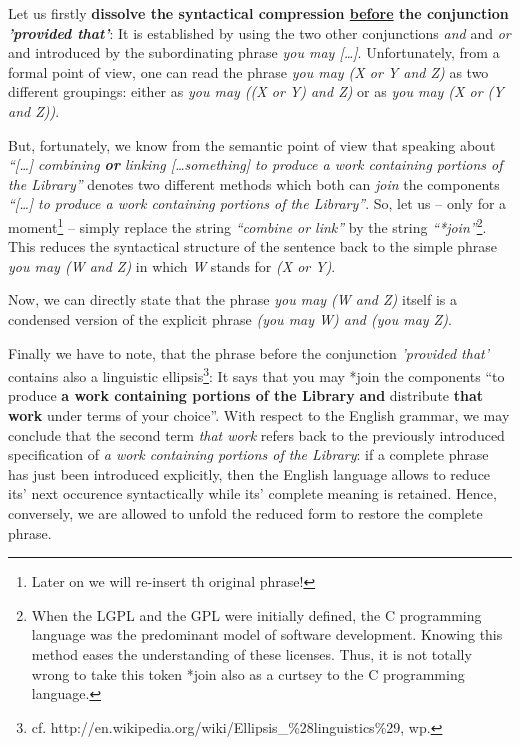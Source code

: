 Let us firstly \textbf{dissolve the syntactical compression \underline{before}
the conjunction \emph{'provided that'}}: It is established by using the two
other conjunctions \emph{and} and \emph{or} and introduced by the subordinating
phrase \emph{you may [\ldots]}. Unfortunately, from a formal point of view, one
can read the phrase \emph{you may (X or Y and Z)} as two different groupings:
either as \emph{you may ((X or Y) and Z)} or as \emph{you may (X or (Y and Z))}.

But, fortunately, we know from the semantic point of view that speaking about
\emph{\enquote{[\ldots] combining \textbf{or} linking [\ldots something] to
produce a work containing portions of the Library}} denotes two different
methods which both can \emph{join} the components \emph{\enquote{[\ldots] to
produce a work containing portions of the Library}}. So, let us -- only for a
moment\footnote{Later on we will re-insert th original phrase!} -- simply
replace the string \emph{\enquote{combine or link}} by the string
\emph{\enquote{*join}}\footnote{When the LGPL and the GPL were initially
defined, the C programming language was the predominant model of software
development. Knowing this method eases the understanding of these licenses.
Thus, it is not totally wrong to take this token *join also as a curtsey to the
C programming language.}. This reduces the syntactical structure of the sentence
back to the simple phrase \emph{you may (W and Z)} in which \emph{W} stands for
\emph{(X or Y)}.

Now, we can directly state that the phrase \emph{you may (W and Z)} itself is a
condensed version of the explicit phrase \emph{ (you may W) and (you may Z)}.

Finally we have to note, that the phrase before the conjunction \emph{'provided
that'} contains also a linguistic ellipsis\footnote{cf.
http://en.wikipedia.org/wiki/Ellipsis\_\%28linguistics\%29, wp.
}: It says that you may *join the components \enquote{to produce \textbf{a work
containing portions of the Library} \textbf{and} distribute \textbf{that work}
under terms of your choice}. With respect to the English grammar, we may
conclude that the second term \emph{that work} refers back to the previously
introduced specification of \emph{a work containing portions of the Library}: if
a complete phrase has just been introduced explicitly, then the English language
allows to reduce its' next occurence syntactically while its' complete meaning
is retained. Hence, conversely, we are allowed to unfold the reduced form to
restore the complete phrase.

